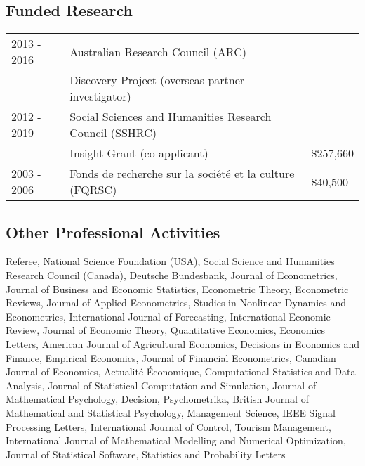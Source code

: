 \documentclass[12pt]{article}
\begin{document}




\subsection*{Funded Research}

\begin{tabular}{lll}
2013 - 2016
& Australian Research Council (ARC) \\
& Discovery Project (overseas partner investigator) \\
2012 - 2019
& Social Sciences and Humanities Research Council (SSHRC) \\
& Insight Grant (co-applicant)
& \$257,660 \\
2003 - 2006
& Fonds de recherche sur la soci\'et\'e et la culture (FQRSC)
& \$40,500 \\
\end{tabular}

\subsection*{Other Professional Activities}

Referee,
National Science Foundation (USA),
Social Science and Humanities Research Council (Canada),
Deutsche Bundesbank,
Journal of Econometrics,
Journal of Business and Economic Statistics,
Econometric Theory,
Econometric Reviews,
Journal of Applied Econometrics,
Studies in Nonlinear Dynamics and Econometrics,
International Journal of Forecasting,
International Economic Review,
Journal of Economic Theory,
Quantitative Economics,
Economics Letters,
American Journal of Agricultural Economics,
Decisions in Economics and Finance,
Empirical Economics,
Journal of Financial Econometrics,
Canadian Journal of Economics,
Actualit\'e \'Economique,
Computational Statistics and Data Analysis,
Journal of Statistical Computation and Simulation,
Journal of Mathematical Psychology,
Decision,
Psychometrika,
British Journal of Mathematical and Statistical Psychology,
Management Science,
IEEE Signal Processing Letters,
International Journal of Control,
Tourism Management,
International Journal of Mathematical Modelling and Numerical Optimization,
Journal of Statistical Software,
Statistics and Probability Letters
\end{document}
